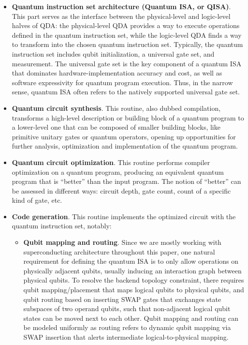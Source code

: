 \documentclass[a4paper,onecolumn,11pt,unpublished]{quantumarticle}
\begin{document}
\begin{itemize}
    \item \textbf{Quantum instruction set architecture (Quantum ISA, or QISA)}. This part serves as the interface between the physical-level and logic-level halves of QDA: the physical-level QDA provides a way to execute operations defined in the quantum instruction set, while the logic-level QDA finds a way to transform into the chosen quantum instruction set. Typically, the quantum instruction set includes qubit initialization, a universal gate set, and measurement. The universal gate set is the key component of a quantum ISA that dominates hardware-implementation accuracy and cost, as well as software expressivity for quantum program execution. Thus, in the narrow sense, quantum ISA often refers to the natively supported universal gate set.
    \item \textbf{Quantum circuit synthesis}. This routine, also dubbed compilation, transforms a high-level description or building block of a quantum program to a lower-level one that can be composed of smaller building blocks, like primitive unitary gates or quantum operators, opening up opportunities for further analysis, optimization and implementation of the quantum program.
    \item \textbf{Quantum circuit optimization}. This routine performs compiler optimization on a quantum program, producing an equivalent quantum program that is ``better'' than the input program. The notion of ``better'' can be assessed in different ways: circuit depth, gate count, count of a specific kind of gate, etc.
    \item \textbf{Code generation}. This routine implements the optimized circuit with the quantum instruction set, notably:
    \begin{itemize}
        \item \textbf{Qubit mapping and routing}. Since we are mostly working with superconducting architecture throughout this paper, one natural requirement for defining the quantum ISA is to only allow operations on physically adjacent qubits, usually inducing an interaction graph between physical qubits. To resolve the backend topology constraint, there requires qubit mapping/placement that maps logical qubits to physical qubits, and qubit routing based on inserting SWAP gates that exchanges state subspaces of two operand qubits, such that non-adjacent logical qubit states can be moved next to each other. Qubit mapping and routing can be modeled uniformly as routing refers to dynamic qubit mapping via SWAP insertion that alerts intermediate logical-to-physical mapping.

\end{itemize}
\end{itemize}
\end{document}
